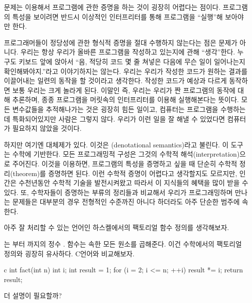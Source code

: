 문제는  이용해서 프로그램에 관한 증명을 하는 것이 굉장히 어렵다는 점이다. 프로그램의 특성을 보이려면 반드시 이상적인 인터프리터를 통해 프로그램을 ``실행''해 보아야만 한다.

프로그래머들이 정당성에 관한 형식적 증명을 절대 수행하지 않는다는 점은 문제가 아니다. 우리는 항상 우리가 올바른 프로그램을 작성하고 있는지에 관해 ``생각''한다.
누구도 키보드 앞에 앉아서 ``음, 적당히 코드 몇 줄 쳐넣은 다음에 무슨 일이 일어나는지 확인해봐야지.''라고 이야기하지는 않는다.
우리는 우리가 작성한 코드가 원하는 결과를 이끌어내는 일련의 동작을 할 것이라고 생각한다. 작성한 코드가 예상과 다르게 동작하면 보통 우리는 크게 놀라게 된다.
이말인 즉, 우리는 우리가 짠 프로그램의 동작에 대해 추론하며, 종종 프로그램을 머릿속의 인터프리터를 이용해 실행해본다는 뜻이다.
모든 변수값들을 추적해나가는 것은 굉장히 힘든 일이고, 컴퓨터는 프로그램을 수행하는데 특화되어있지만 사람은 그렇지 않다.
우리가 이런 일을 잘 해낼 수 있었다면 컴퓨터가 필요하지 않았을 것이다.

하지만 여기엔 대체제가 있다. 이것은 \newterm{\trDenotationalSemantics}(denotational semantics)라고 불린다. 이 도구는 수학에 기반한다.
 모든 프로그래밍적 구성은 그것의 수학적 해석(interpretation)으로 주어진다.
이것을 이용하면, 프로그램의 특성을 증명하고 싶을 때 단순히 수학적 정리(theorem)를 증명하면 된다.
이런 수학적 증명이 어렵다고 생각할지도 모르지만, 인간은 수천년동안 수학적 기술을 발전시켜왔고 따라서 이 지식들의 혜택을 많이 받을 수 있다.
또, 수학자들이 증명하는 부류의 정리들과 비교해서 우리가 프로그래밍하며 만나는 문제들은 대부분의 경우 전형적인 수준까진 아니다 하더라도 아주 단순한 범주에 속한다.

 아주 잘 처리할 수 있는 언어인 하스켈에서의 팩토리얼 함수 정의를 생각해보자. 


\trExpression \code{{[}1..n{]}} 는  부터 까지의 정수 .   함수는  속한 모든 원소를 곱해준다. 이건 수학에서의 팩토리얼 정의와 굉장히 유사하다. C언어와 비교해보자.

\begin{snip}{c}
int fact(int n) {
    int i;
    int result = 1;
    for (i = 2; i <= n; ++i)
        result *= i;
    return result;
}
\end{snip}

더 설명이 필요할까?

